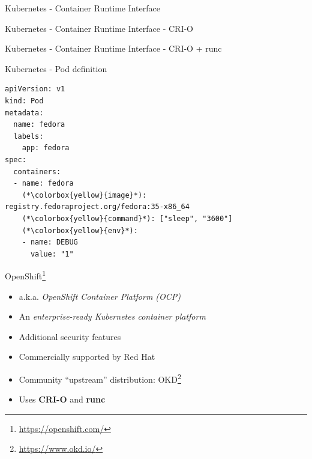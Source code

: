 \documentclass[ignorenonframetext,aspectratio=169,12pt]{beamer}
\def\svgwidth{4cm}
\begin{document}
\begin{frame}{Kubernetes - Container Runtime Interface}
\begin{center}
\def\svgwidth{\textwidth}

\end{center}
\end{frame}

\begin{frame}{Kubernetes - Container Runtime Interface - CRI-O}
\begin{center}
\def\svgwidth{\textwidth}

\end{center}
\end{frame}

\begin{frame}{Kubernetes - Container Runtime Interface - CRI-O + runc}
\begin{center}
\def\svgwidth{\textwidth}

\end{center}
\end{frame}

\begin{frame}[fragile]{Kubernetes - Pod definition}
\protect\hypertarget{kubernetes-pod-spec}{}
\begin{lstlisting}
apiVersion: v1
kind: Pod
metadata:
  name: fedora
  labels:
    app: fedora
spec:
  containers:
  - name: fedora
    (*\colorbox{yellow}{image}*): registry.fedoraproject.org/fedora:35-x86_64
    (*\colorbox{yellow}{command}*): ["sleep", "3600"]
    (*\colorbox{yellow}{env}*):
    - name: DEBUG
      value: "1"
\end{lstlisting}
\end{frame}

\begin{frame}{OpenShift\footnote{\url{https://openshift.com/}}}
\protect\hypertarget{openshift-intro}{}

\begin{itemize}
\item a.k.a. {\em OpenShift Container Platform (OCP)}
\item An {\em enterprise-ready Kubernetes container platform}
\item Additional security features
\item Commercially supported by Red Hat
\item Community ``upstream'' distribution: OKD\footnote{\url{https://www.okd.io/}}
\item Uses {\bf CRI-O} and {\bf runc}
\end{itemize}

\end{frame}
\end{document}
